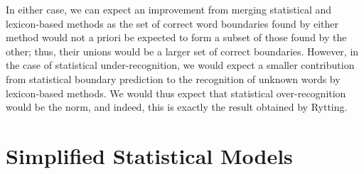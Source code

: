 In either case, we can expect an improvement from merging statistical and lexicon-based methods as the set of correct word boundaries found by either method would not a priori be expected to form a subset of those found by the other; thus, their unions would be a larger set of correct boundaries. However, in the case of statistical under-recognition, we would expect a smaller contribution from statistical boundary prediction to the recognition of unknown words by lexicon-based methods. We would thus expect that statistical over-recognition would be the norm, and indeed, this is exactly the result obtained by Rytting\cite{rytting04}.

\section{Simplified Statistical Models}

